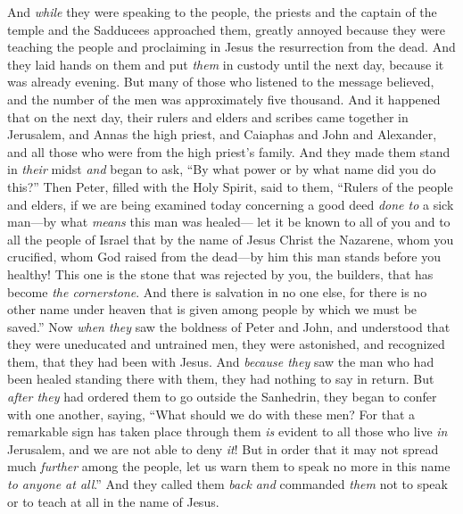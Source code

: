 \begin{biblechapter} %
 And \textit{while} they were speaking to the people, the priests and the captain of the temple and the Sadducees approached them,
\verse greatly annoyed because they were teaching the people and proclaiming in Jesus the resurrection from the dead.
\verse And they laid hands on them and put \textit{them} in custody until the next day, because it was already evening.
\verse But many of those who listened to the message believed, and the number of the men was approximately five thousand.
 And it happened that on the next day, their rulers and elders and scribes came together in Jerusalem,
\verse and Annas the high priest, and Caiaphas and John and Alexander, and all those who were from the high priest’s family.
\verse And they made them stand in \textit{their} midst \textit{and} began to ask, “By what power or by what name did you do this?”
\verse Then Peter, filled with the Holy Spirit, said to them, “Rulers of the people and elders,
\verse if we are being examined today concerning a good deed \textit{done to} a sick man—by what \textit{means} this man was healed—
\verse let it be known to all of you and to all the people of Israel that by the name of Jesus Christ the Nazarene, whom you crucified, whom God raised from the dead—by him this man stands before you healthy!
\verse This one is the stone that was rejected by you, the builders, that has become \textit{the cornerstone}.
\verse And there is salvation in no one else, for there is no other name under heaven that is given among people by which we must be saved.”
\verse Now \textit{when they} saw the boldness of Peter and John, and understood that they were uneducated and untrained men, they were astonished, and recognized them, that they had been with Jesus.
\verse And \textit{because they} saw the man who had been healed standing there with them, they had nothing to say in return.
\verse But \textit{after they} had ordered them to go outside the Sanhedrin, they began to confer with one another,
\verse saying, “What should we do with these men? For that a remarkable sign has taken place through them \textit{is} evident to all those who live \textit{in} Jerusalem, and we are not able to deny \textit{it}!
\verse But in order that it may not spread much \textit{further} among the people, let us warn them to speak no more in this name \textit{to anyone at all}.”
\verse And they called them \textit{back} \textit{and} commanded \textit{them} not to speak or to teach at all in the name of Jesus.

\end{biblechapter}

